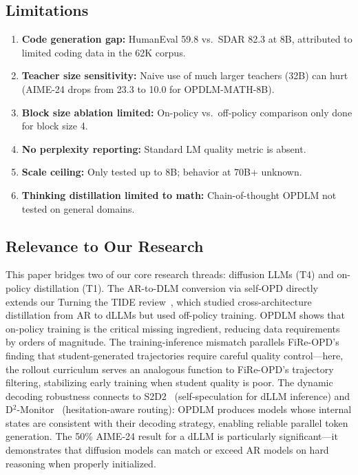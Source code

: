 \documentclass[11pt,a4paper]{article}
\begin{document}
\subsection{Limitations}

\begin{enumerate}
\item \textbf{Code generation gap:} HumanEval 59.8 vs.\ SDAR 82.3 at 8B, attributed to limited coding data in the 62K corpus.
\item \textbf{Teacher size sensitivity:} Naive use of much larger teachers (32B) can hurt (AIME-24 drops from 23.3 to 10.0 for OPDLM-MATH-8B).
\item \textbf{Block size ablation limited:} On-policy vs.\ off-policy comparison only done for block size 4.
\item \textbf{No perplexity reporting:} Standard LM quality metric is absent.
\item \textbf{Scale ceiling:} Only tested up to 8B; behavior at 70B+ unknown.
\item \textbf{Thinking distillation limited to math:} Chain-of-thought OPDLM not tested on general domains.
\end{enumerate}

\subsection{Relevance to Our Research}

This paper bridges two of our core research threads: diffusion LLMs (T4) and on-policy distillation (T1). The AR-to-DLM conversion via self-OPD directly extends our Turning the TIDE review~\cite{tide2026}, which studied cross-architecture distillation from AR to dLLMs but used off-policy training. OPDLM shows that on-policy training is the critical missing ingredient, reducing data requirements by orders of magnitude. The training-inference mismatch parallels FiRe-OPD's~\cite{fire2026} finding that student-generated trajectories require careful quality control---here, the rollout curriculum serves an analogous function to FiRe-OPD's trajectory filtering, stabilizing early training when student quality is poor. The dynamic decoding robustness connects to S2D2~\cite{s2d22026} (self-speculation for dLLM inference) and D$^2$-Monitor~\cite{d2monitor2026} (hesitation-aware routing): OPDLM produces models whose internal states are consistent with their decoding strategy, enabling reliable parallel token generation. The 50\% AIME-24 result for a dLLM is particularly significant---it demonstrates that diffusion models can match or exceed AR models on hard reasoning when properly initialized.
\end{document}
